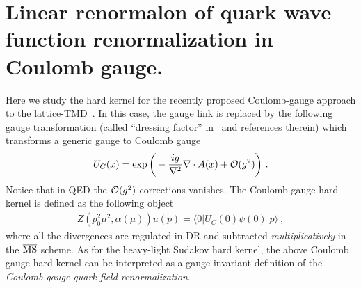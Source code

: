 \documentclass[a4paper,11pt]{article}
\begin{document}
\section{Linear renormalon of quark wave function renormalization in Coulomb gauge.}\label{sec:coulomb}
Here we study the hard kernel for the recently proposed Coulomb-gauge approach to the lattice-TMD~\cite{Gao:2023lny,Zhao:2023ptv}. In this case, the gauge link is replaced by the following gauge transformation (called ``dressing factor'' in~\cite{Zhao:2023ptv} and references therein) which transforms a generic gauge to Coulomb gauge
\begin{align}\label{eq:CGDS}
U_{C}(x)=\exp \bigg(-\frac{ig}{\nabla^2}\nabla \cdot A(x)+{\cal O}(g^2)\bigg) \ .
\end{align}
Notice that in QED the ${\cal O}(g^2)$ corrections vanishes. The Coulomb gauge hard kernel is defined as the following object
\begin{align}
Z(p_0^2\mu^2,\alpha(\mu))u(p)=\langle 0|U_{C}(0)\psi(0)|p\rangle \ ,
\end{align}
where all the divergences are regulated in DR and subtracted {\it multiplicatively} in the $\overline{\rm MS}$ scheme. As for the heavy-light Sudakov hard kernel, the above Coulomb gauge hard kernel can be interpreted as a gauge-invariant definition of the {\it Coulomb gauge quark field renormalization}. 
\end{document}
